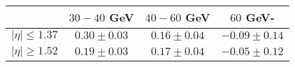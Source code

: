 \centering
\begin{tabular}{|c|c|c|c|} \hline
 & $30-40$ GeV & $40-60$ GeV & $60$ GeV-\\\hline
$\lvert \eta \rvert \leq 1.37$ & $0.30\pm0.03$ & $0.16\pm0.04$ & $-0.09\pm0.14$\\\hline
$\lvert \eta \rvert \geq 1.52$ & $0.19\pm0.03$ & $0.17\pm0.04$ & $-0.05\pm0.12$\\\hline
\end{tabular}